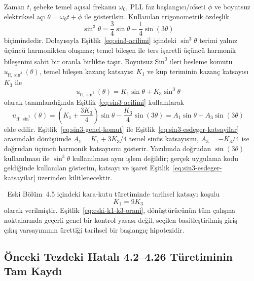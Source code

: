 Zaman $t$, şebeke temel açısal frekansı $\omega_0$, PLL faz başlangıcı/ofseti $\phi$ ve boyutsuz elektriksel açı $\theta=\omega_0t+\phi$ ile gösterilsin. Kullanılan trigonometrik özdeşlik
\begin{equation}
  \sin^3\theta=\frac{3}{4}\sin\theta-\frac{1}{4}\sin(3\theta)
  \label{eq:sin3-acilimi}
\end{equation}
biçimindedir. Dolayısıyla Eşitlik~\eqref{eq:sin3-acilimi} içindeki $\sin^3\theta$ terimi yalnız üçüncü harmonikten oluşmaz; temel bileşen ile ters işaretli üçüncü harmonik bileşenini sabit bir oranla birlikte taşır. Boyutsuz Sin\textsuperscript{3} ileri besleme komutu $u_{\mathrm{ff},\sin^3}(\theta)$, temel bileşen kazanç katsayısı $K_1$ ve küp teriminin kazanç katsayısı $K_3$ ile
\begin{equation}
  u_{\mathrm{ff},\sin^3}(\theta)=K_1\sin\theta+K_3\sin^3\theta
  \label{eq:sin3-genel-komut}
\end{equation}
olarak tanımlandığında Eşitlik~\eqref{eq:sin3-acilimi} kullanılarak
\begin{equation}
  u_{\mathrm{ff},\sin^3}(\theta)
  =\left(K_1+\frac{3K_3}{4}\right)\sin\theta-\frac{K_3}{4}\sin(3\theta)
  =A_1\sin\theta+A_3\sin(3\theta)
  \label{eq:sin3-esdeger-katsayilar}
\end{equation}
elde edilir. Eşitlik~\eqref{eq:sin3-genel-komut} ile Eşitlik~\eqref{eq:sin3-esdeger-katsayilar} arasındaki dönüşümde $A_1=K_1+3K_3/4$ temel sinüs katsayısını, $A_3=-K_3/4$ ise doğrudan üçüncü harmonik katsayısını gösterir. Yazılımda doğrudan $\sin(3\theta)$ kullanılması ile $\sin^3\theta$ kullanılması aynı işlem değildir; gerçek uygulama kodu geldiğinde kullanılan gösterim, katsayı ve işaret Eşitlik~\eqref{eq:sin3-esdeger-katsayilar} üzerinden kilitlenecektir.

\eskitezetiketi\ Eski Bölüm~4.5 içindeki kara-kutu türetiminde tarihsel katsayı koşulu
\begin{equation}
  K_1=9K_3
  \label{eq:eski-k1-k3-orani}
\end{equation}
olarak verilmiştir. Eşitlik~\eqref{eq:eski-k1-k3-orani}, dönüştürücünün tüm çalışma noktalarında geçerli genel bir kontrol yasası değil, seçilen basitleştirilmiş giriş--çıkış varsayımının ürettiği tarihsel bir başlangıç hipotezidir.

\subsection{Önceki Tezdeki Hatalı 4.2--4.26 Türetiminin Tam Kaydı}

